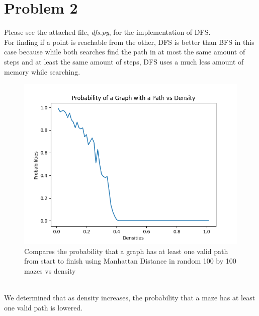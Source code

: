 \documentclass[12pt]{report}
\begin{document}
\section{Problem 2}
Please see the attached file, \emph{dfs.py}, for the implementation of DFS.\\
For finding if a point is reachable from the other, DFS is better than BFS in this case because while both searches find the path in at most the same amount of steps and at least the same amount of steps, DFS uses a much less amount of memory while searching.\\
\begin{figure}[h]
\includegraphics[width=\textwidth]{Probability of a Graph with Path vs Density.png}
\caption{Compares the probability that a graph has at least one valid path from start to finish using Manhattan Distance in random 100 by 100 mazes vs density}
\label{Probability of a Graph with a Complete Path vs Density}
\end{figure}\\
We determined that as density increases, the probability that a maze has at least one valid path is lowered.

\break
\end{document}
